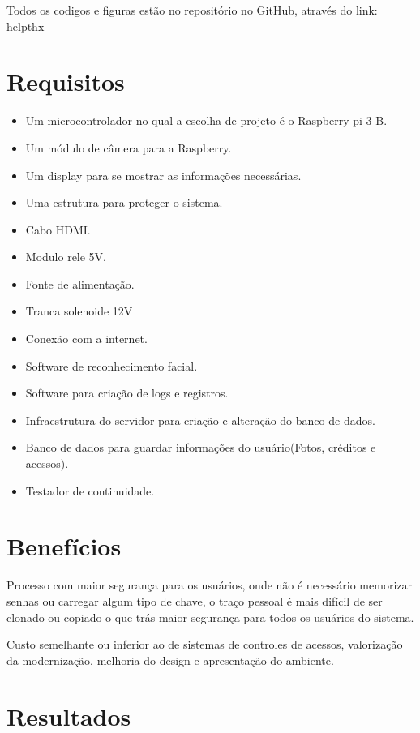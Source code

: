 \documentclass[conference,compsoc]{IEEEtran}
\begin{document}
Todos os codigos e figuras estão no repositório no GitHub, através do link:
\href{https://github.com/helpthx/Sistemas_Embarcados/tree/master/2_PCs/Ponto_de_Controle_3/Arquivos}{helpthx}

\section{Requisitos}
\begin{itemize}
   \item Um microcontrolador no qual a escolha de projeto é o Raspberry pi 3 B. 
   \item Um módulo de câmera para a Raspberry.
   \item Um display para se mostrar as informações necessárias.
   \item Uma estrutura para proteger o sistema.
   \item Cabo HDMI.
   \item Modulo rele 5V.
   \item Fonte de alimentação.
   \item Tranca solenoide 12V
   \item Conexão com a internet.
   \item Software de reconhecimento facial.
   \item Software  para criação de logs e registros.
   \item  Infraestrutura do servidor para criação e alteração do banco de dados.
   \item Banco de dados para guardar informações do usuário(Fotos, créditos e acessos).
   \item Testador de continuidade.
 \end{itemize}
 
\section{Benefícios}
Processo com maior segurança para os usuários, onde não é necessário  memorizar senhas ou carregar algum tipo de chave, o traço pessoal é mais difícil de ser clonado ou copiado o que trás maior segurança para todos os usuários do sistema.

Custo semelhante ou inferior ao de sistemas de controles de acessos, valorização da modernização, melhoria do design e apresentação do ambiente.

\section{Resultados}
\end{document}
